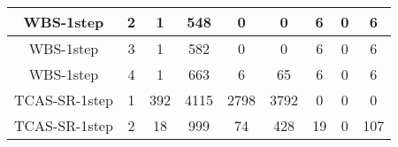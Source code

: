 \begin{table}[]
\begin{tabular}{@{}ccccccccc@{}}
        WBS-1step                                                   & 2                                                            & 1                                                          & 548                                                         & 0                                                              & 0                                                              & 6                                                          & 0                                                             & 6        \\ \midrule
        WBS-1step                                                   & 3                                                            & 1                                                          & 582                                                         & 0                                                              & 0                                                              & 6                                                          & 0                                                             & 6        \\ \midrule
        WBS-1step                                                   & 4                                                            & 1                                                          & 663                                                         & 6                                                              & 65                                                             & 6                                                          & 0                                                             & 6        \\ \midrule
        TCAS-SR-1step                                               & 1                                                            & 392                                                        & 4115                                                        & 2798                                                           & 3792                                                           & 0                                                          & 0                                                             & 0        \\ \midrule
        TCAS-SR-1step                                               & 2                                                            & 18                                                         & 999                                                         & 74                                                             & 428                                                            & 19                                                         & 0                                                             & 107      \\ \midrule

\end{tabular}
\end{table}
